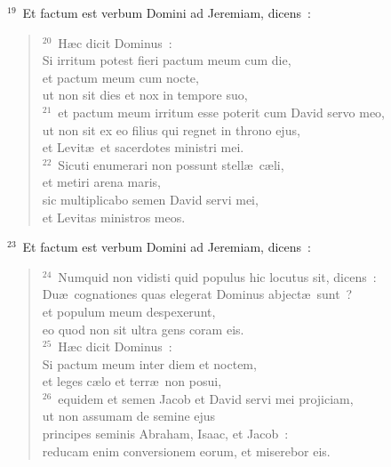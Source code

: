 ${}^{19}$~Et factum est verbum Domini ad Jeremiam, dicens~:
\begin{verse}${}^{20}$~H\ae c dicit Dominus~:\\ Si irritum potest fieri pactum meum cum die,\\ et pactum meum cum nocte,\\ ut non sit dies et nox in tempore suo,\\
${}^{21}$~et pactum meum irritum esse poterit cum David servo meo,\\ ut non sit ex eo filius qui regnet in throno ejus,\\ et Levit\ae\ et sacerdotes ministri mei.\\
${}^{22}$~Sicuti enumerari non possunt stell\ae\ c\ae li,\\ et metiri arena maris,\\ sic multiplicabo semen David servi mei,\\ et Levitas ministros meos.\end{verse}


${}^{23}$~Et factum est verbum Domini ad Jeremiam, dicens~:
\begin{verse}${}^{24}$~Numquid non vidisti quid populus hic locutus sit, dicens~:\\ Du\ae\ cognationes quas elegerat Dominus abject\ae\ sunt~?\\ et populum meum despexerunt,\\ eo quod non sit ultra gens coram eis.\\
${}^{25}$~H\ae c dicit Dominus~:\\ Si pactum meum inter diem et noctem,\\ et leges c\ae lo et terr\ae\ non posui,\\
${}^{26}$~equidem et semen Jacob et David servi mei projiciam,\\ ut non assumam de semine ejus\\ principes seminis Abraham, Isaac, et Jacob~:\\ reducam enim conversionem eorum, et miserebor eis.\end{verse}



